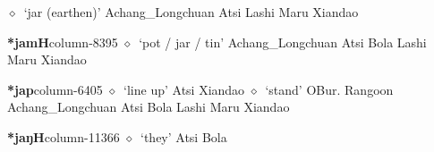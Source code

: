          $\diamond$~`jar (earthen)'
         Achang\_Longchuan 
\hspace{1ex}
         Atsi 
\hspace{1ex}
         Lashi 
\hspace{1ex}
         Maru 
\hspace{1ex}
         Xiandao 
  \item {\footnotesize \textbf{*jamH}}{\tiny column-8395}
         $\diamond$~`pot / jar / tin'
         Achang\_Longchuan 
\hspace{1ex}
         Atsi 
\hspace{1ex}
         Bola 
\hspace{1ex}
         Lashi 
\hspace{1ex}
         Maru 
\hspace{1ex}
         Xiandao 
  \item {\footnotesize \textbf{*jap}}{\tiny column-6405}
         $\diamond$~`line up'
         Atsi 
\hspace{1ex}
         Xiandao 
\hspace{1ex}
         $\diamond$~`stand'
         OBur. 
\hspace{1ex}
         Rangoon 
\hspace{1ex}
         Achang\_Longchuan 
\hspace{1ex}
         Atsi 
\hspace{1ex}
         Bola 
\hspace{1ex}
         Lashi 
\hspace{1ex}
         Maru 
\hspace{1ex}
         Xiandao 
  \item {\footnotesize \textbf{*jaŋH}}{\tiny column-11366}
         $\diamond$~`they'
         Atsi 
\hspace{1ex}
         Bola 
\hspace{1ex}
